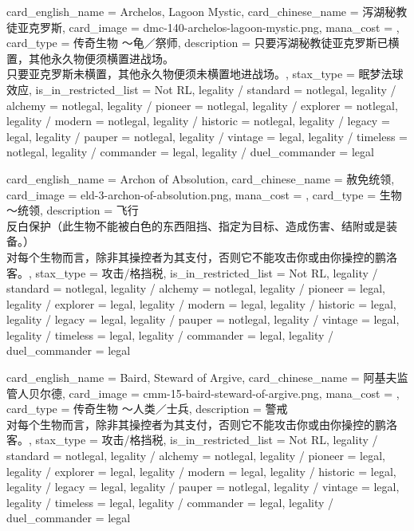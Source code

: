 \documentclass[lang = cn, color = black, 10pt]{AllThatStax}
\begin{document}
\card
{
	card_english_name = {Archelos, Lagoon Mystic},
	card_chinese_name = {泻湖秘教徒亚克罗斯},
	card_image = dmc-140-archelos-lagoon-mystic.png,
	mana_cost = ,
	card_type = 传奇生物 ～龟／祭师,
	description = {只要泻湖秘教徒亚克罗斯已横置，其他永久物便须横置进战场。\\
		只要亚克罗斯未横置，其他永久物便须未横置地进战场。},
	stax_type = 眠梦法球效应,
	is_in_restricted_list = Not RL,
	legality / standard = notlegal,
	legality / alchemy = notlegal,
	legality / pioneer = notlegal,
	legality / explorer = notlegal,
	legality / modern = notlegal,
	legality / historic = notlegal,
	legality / legacy = legal,
	legality / pauper = notlegal,
	legality / vintage = legal,
	legality / timeless = notlegal,
	legality / commander = legal,
	legality / duel_commander = legal
}

\card
{
	card_english_name = {Archon of Absolution},
	card_chinese_name = {赦免统领},
	card_image = eld-3-archon-of-absolution.png,
	mana_cost = ,
	card_type = 生物 ～统领,
	description = {飞行\\
		反白保护（此生物不能被白色的东西阻挡、指定为目标、造成伤害、结附或是装备。）\\
		对每个生物而言，除非其操控者为其支付，否则它不能攻击你或由你操控的鹏洛客。},
	stax_type = 攻击/格挡税,
	is_in_restricted_list = Not RL,
	legality / standard = notlegal,
	legality / alchemy = notlegal,
	legality / pioneer = legal,
	legality / explorer = legal,
	legality / modern = legal,
	legality / historic = legal,
	legality / legacy = legal,
	legality / pauper = notlegal,
	legality / vintage = legal,
	legality / timeless = legal,
	legality / commander = legal,
	legality / duel_commander = legal
}

\card
{
	card_english_name = {Baird, Steward of Argive},
	card_chinese_name = {阿基夫监管人贝尔德},
	card_image = cmm-15-baird-steward-of-argive.png,
	mana_cost = ,
	card_type = 传奇生物 ～人类／士兵,
	description = {警戒\\
		对每个生物而言，除非其操控者为其支付，否则它不能攻击你或由你操控的鹏洛客。},
	stax_type = 攻击/格挡税,
	is_in_restricted_list = Not RL,
	legality / standard = notlegal,
	legality / alchemy = notlegal,
	legality / pioneer = legal,
	legality / explorer = legal,
	legality / modern = legal,
	legality / historic = legal,
	legality / legacy = legal,
	legality / pauper = notlegal,
	legality / vintage = legal,
	legality / timeless = legal,
	legality / commander = legal,
	legality / duel_commander = legal
}
\end{document}
